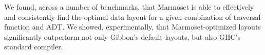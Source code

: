 \documentclass[acmsmall,review,anonymous]{acmart}\settopmatter{printfolios=true,printccs=false,printacmref=false}
\newcommand{\system}{{\sc Marmoset}\xspace}
\begin{document}
We found, across a number of benchmarks, that \system is able to effectively and consistently find the optimal data layout for a given combination of traversal function and ADT. We showed, experimentally, that \system-optimized layouts significantly outperform not only Gibbon's default layouts, but also GHC's standard compiler.
\end{document}

